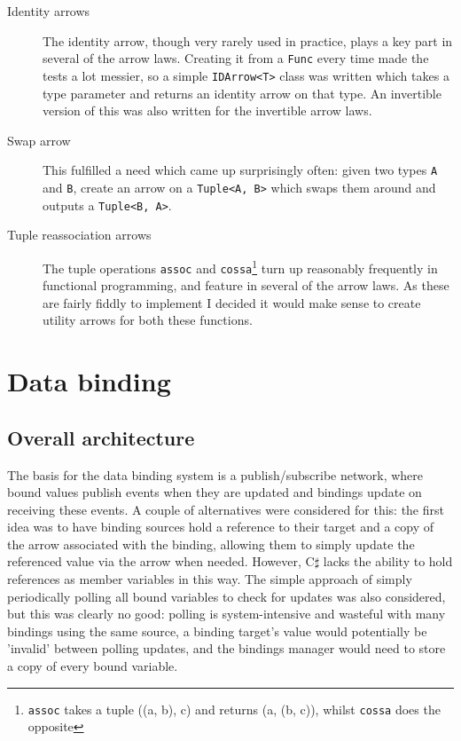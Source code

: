 \documentclass[12pt,twoside,notitlepage]{report}
\begin{document}
\begin{description}
	\item[Identity arrows] The identity arrow, though very rarely used in practice, plays a key part in several of the arrow laws. Creating it from a \texttt{Func} every time made the tests a lot messier, so a simple \texttt{IDArrow<T>} class was written which takes a type parameter and returns an identity arrow on that type. An invertible version of this was also written for the invertible arrow laws.
	\item[Swap arrow] This fulfilled a need which came up surprisingly often: given two types \texttt{A} and \texttt{B}, create an arrow on a \texttt{Tuple<A, B>} which swaps them around and outputs a \texttt{Tuple<B, A>}.
	\item[Tuple reassociation arrows] The tuple operations \texttt{assoc} and \texttt{cossa}\footnote{\texttt{assoc} takes a tuple ((a, b), c) and returns (a, (b, c)), whilst \texttt{cossa} does the opposite} turn up reasonably frequently in functional programming, and feature in several of the arrow laws. As these are fairly fiddly to implement I decided it would make sense to create utility arrows for both these functions.
\end{description}




\section{Data binding}

\subsection{Overall architecture}

The basis for the data binding system is a publish/subscribe network, where bound values publish events when they are updated and bindings update on receiving these events. A couple of alternatives were considered for this: the first idea was to have binding sources hold a reference to their target and a copy of the arrow associated with the binding, allowing them to simply update the referenced value via the arrow when needed. However, C$\sharp$ lacks the ability to hold references as member variables in this way. The simple approach of simply periodically polling all bound variables to check for updates was also considered, but this was clearly no good: polling is system-intensive and wasteful with many bindings using the same source, a binding target's value would potentially be 'invalid' between polling updates, and the bindings manager would need to store a copy of every bound variable.
\end{document}

